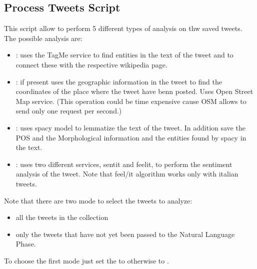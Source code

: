 \documentclass[letterpaper,10pt,english]{sphinxmanual}
\begin{document}
\subsection{Process Tweets Script}
\label{\detokenize{guide/tweet_processor_guide:process-tweets-script}}\label{\detokenize{guide/tweet_processor_guide::doc}}
\sphinxAtStartPar
This script allow to perform 5 different types of analysis on thw saved tweets.
The possible analysis are:
\begin{itemize}
\item {} 
\sphinxAtStartPar
{}: uses the TagMe service to find entities in the text of the tweet and to connect these with the respective wikipedia page.

\item {} 
\sphinxAtStartPar
{}: if present uses the geographic information in the tweet to find the coordinates of the place where the tweet have benn posted. Uses Open Street Map service. (This operation could be time expensive cause OSM allows to send only one request per second.)

\item {} 
\sphinxAtStartPar
{}: uses spacy model to lemmatize the text of the tweet. In addition save the POS and the Morphological information and the entities found by spacy in the text.

\item {} 
\sphinxAtStartPar
{}: uses two different services, sent\sphinxhyphen{}it and feel\sphinxhyphen{}it, to perform the sentiment analysis of the tweet. Note that feel/it algorithm works only with italian tweets.

\end{itemize}

\sphinxAtStartPar
Note that there are two mode to select the tweets to analyze:
\begin{itemize}
\item {} 
\sphinxAtStartPar
all the tweets in the collection

\item {} 
\sphinxAtStartPar
only the tweets that have not yet been passed to the Natural Language Phase.

\end{itemize}

\sphinxAtStartPar
To choose the first mode just set the  to  otherwise to .
\end{document}
